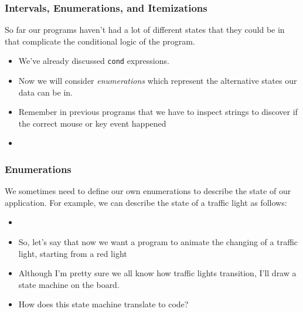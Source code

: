 \documentclass{beamer}
\begin{document}

\begin{frame}
  \frametitle{Intervals, Enumerations, and Itemizations}
  So far our programs haven't had a lot of different states that they could
  be in that complicate the conditional logic of the program.
  \begin{itemize}
  \item<2-> We've already discussed \texttt{cond} expressions.
  \item<3-> Now we will consider \emph{enumerations} which represent the alternative states our data can be in.
  \item<4-> Remember in previous programs that we have to inspect strings
    to discover if the correct mouse or key event happened
  \item<5-> \mouseEnum
  \end{itemize}
\end{frame}


\begin{frame}
  \frametitle{Enumerations}
  We sometimes need to define our own enumerations to describe
  the state of our application. For example, we can describe
  the state of a traffic light as follows:
  \begin{itemize}
  \item<2-> \trafficEnum
  \item<3-> So, let's say that now we want a program to animate the changing
    of a traffic light, starting from a red light
  \item<4-> Although I'm pretty sure we all know how traffic lights transition,
    I'll draw a state machine on the board.
  \item<5-> How does this state machine translate to code?    
  \end{itemize}
\end{frame}
\end{document}
